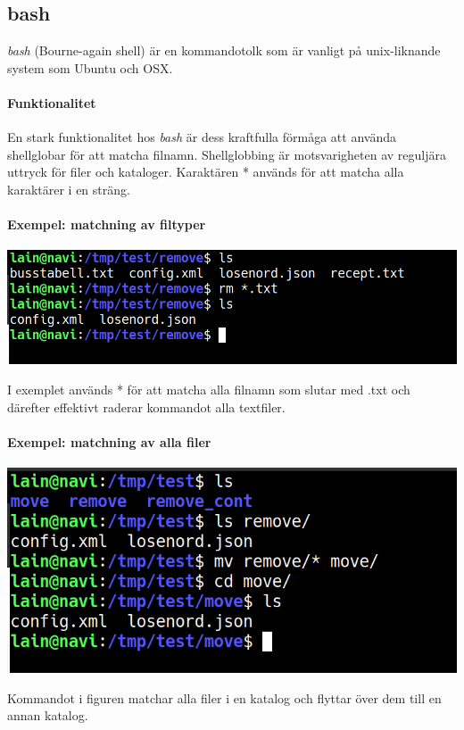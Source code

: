 \subsection{bash}
\emph{bash} (Bourne-again shell) är en kommandotolk som är vanligt på unix-liknande system som Ubuntu och OSX. 
\paragraph{Funktionalitet}
En stark funktionalitet hos \emph{bash} är dess kraftfulla förmåga att använda shellglobar för att matcha filnamn.
Shellglobbing är motsvarigheten av reguljära uttryck för filer och kataloger. Karaktären * används för att matcha alla karaktärer i en sträng.
\newpage
\paragraph{Exempel: matchning av filtyper}
\begin{center}
        \includegraphics[width=\linewidth]{bilder/bash_remove_filetype.png}
\end{center}
I exemplet används * för att matcha alla filnamn som slutar med .txt och därefter effektivt raderar kommandot alla textfiler.
\paragraph{Exempel: matchning av alla filer}
\begin{center}
        \includegraphics[width=\linewidth]{bilder/bash_move_files.png}
\end{center}
Kommandot i figuren matchar alla filer i en katalog och flyttar över dem till en annan katalog.
